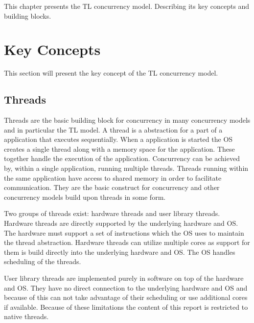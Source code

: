\makeatletter {}\makeatother
{}
This chapter presents the \ac{TL} concurrency model. Describing its key concepts and building blocks. 
\label{chap:threads_locks}
\section{Key Concepts}
This section will present the key concept of the \ac{TL} concurrency model. 
\subsection{Threads}\label{subsec:threads}
Threads are the basic building block for concurrency in many concurrency models and in particular the \ac{TL} model. A thread is a abstraction for a part of a application that executes sequentially. When a application is started the \ac{OS} creates a single thread along with a memory space for the application. These together handle the execution of the application. Concurrency can be achieved by, within a single application, running multiple threads. Threads running within the same application have access to shared memory in order to facilitate communication. They are the basic construct for concurrency and other concurrency models build upon threads in some form.

Two groups of threads exist: hardware threads and user library threads. Hardware threads are directly supported by the underlying hardware and \ac{OS}. The hardware must support a set of instructions which the \ac{OS} uses to maintain the thread abstraction. Hardware threads can utilize multiple cores as support for them is build directly into the underlying hardware and \ac{OS}. The \ac{OS} handles scheduling of the threads.

User library threads are implemented purely in software on top of the hardware and \ac{OS}. They have no direct connection to the underlying hardware and \ac{OS} and because of this can not take advantage of their scheduling or use additional cores if available. Because of these limitations the content of this report is restricted to native threads.

